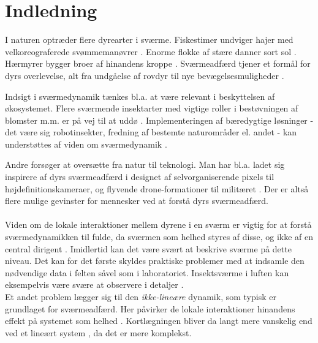 \chapter{Indledning}\label{ch:introduction}

I naturen optræder flere dyrearter i sværme. Fiskestimer undviger hajer med velkoreograferede svømmemanøvrer \cite{fishschooling}. Enorme flokke af stære danner sort sol \cite{sortsol}. Hærmyrer bygger broer af hinandens kroppe \cite{armyants}. Sværmeadfærd tjener et formål for dyrs overlevelse, alt fra undgåelse af rovdyr til nye bevægelsesmuligheder \cite{biofoundations}.
\par
Indsigt i sværmedynamik tænkes bl.a. at være relevant i beskyttelsen af økosystemet. Flere sværmende insektarter med vigtige roller i bestøvningen af blomster m.m. er på vej til at uddø \cite{ripinsects}. Implementeringen af bæredygtige løsninger - det være sig robotinsekter, fredning af bestemte naturområder el. andet - kan understøttes af viden om sværmedynamik \cite{beespatent}\cite{swarmdecline}.
\par
Andre forsøger at oversætte fra natur til teknologi. Man har bl.a. ladet sig inspirere af dyrs sværmeadfærd i designet af selvorganiserende pixels til højdefinitionskameraer, og flyvende drone-formationer til militæret \cite{camera}\cite{pentagon}. Der er altså flere mulige gevinster for mennesker ved at forstå dyrs sværmeadfærd.
\\\\
Viden om de lokale interaktioner mellem dyrene i en sværm er vigtig for at forstå sværmedynamikken til fulde, da sværmen som helhed styres af disse, og ikke af en central dirigent \cite{selforganimals}.  
Imidlertid kan det være svært at beskrive sværme på dette niveau. Det kan for det første skyldes praktiske problemer med at indsamle den nødvendige data i felten såvel som i laboratoriet. Insektsværme i luften kan eksempelvis være svære at observere i detaljer \cite{swarmsaredifficult}.\\ 
Et andet problem lægger sig til den \textit{ikke-lineære} dynamik, som typisk er grundlaget for sværmeadfærd. Her påvirker de lokale interaktioner hinandens effekt på systemet som helhed \cite{swarmsarenonlinear}. Kortlægningen bliver da langt mere vanskelig end ved et lineært system \cite{nonlinear}, da det er mere komplekst.
